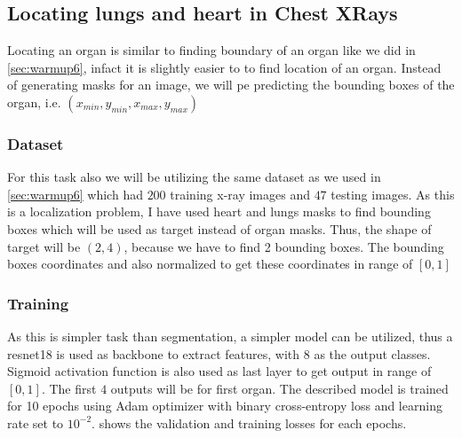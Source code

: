 \subsection{Locating lungs and heart in Chest XRays}
\label{sec:warmup7}

    Locating an organ is similar to finding boundary of an organ like we did in \cref{sec:warmup6}, infact it is slightly easier to to find location of an organ. Instead of generating masks for an image, we will pe predicting the bounding boxes of the organ, i.e. $(x_{min}, y_{min}, x_{max}, y_{max})$ 

\subsubsection{Dataset}
    For this task also we will be utilizing the same dataset as we used in \cref{sec:warmup6} which had $200$ training x-ray images and $47$ testing images. As this is a localization problem, I have used heart and lungs masks to find bounding boxes which will be used as target instead of organ masks. Thus, the shape of target will be $(2,4)$, because we have to find 2 bounding boxes. The bounding boxes coordinates and also normalized to get these coordinates in range of $[0,1]$

\subsubsection{Training}
 
    As this is simpler task than segmentation, a simpler model can be utilized, thus a resnet18 is used as backbone to extract features, with $8$ as the output classes. Sigmoid activation function is also used as last layer to get output in range of $[0,1]$. The first $4$ outputs will be for first organ. The described model is trained for 10 epochs using Adam optimizer with binary cross-entropy loss and learning rate set to $10^{-2}$.  shows the validation and training losses for each epochs. 

